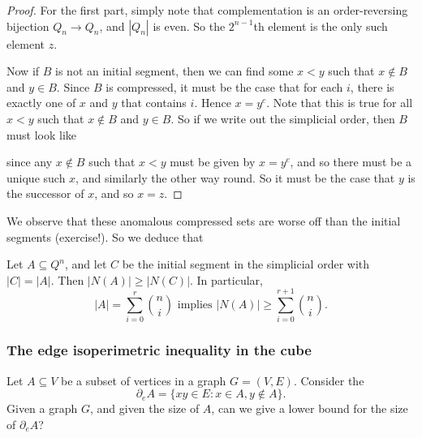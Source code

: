 \documentclass[a4paper]{article}
\begin{document}
\begin{proof}
  For the first part, simply note that complementation is an order-reversing bijection $Q_n \to Q_n$, and $|Q_n|$ is even. So the $2^{n - 1}$th element is the only such element $z$.

  Now if $B$ is not an initial segment, then we can find some $x < y$ such that $x \not \in B$ and $y \in B$. Since $B$ is compressed, it must be the case that for each $i$, there is exactly one of $x$ and $y$ that contains $i$. Hence $x = y^c$. Note that this is true for all $x < y$ such that $x \not \in B$ and $y \in B$. So if we write out the simplicial order, then $B$ must look like
  \begin{center}
  \end{center}
 since any $x \not \in B$ such that $x < y$ must be given by $x = y^c$, and so there must be a unique such $x$, and similarly the other way round. So it must be the case that $y$ is the successor of $x$, and so $x = z$.
\end{proof}
We observe that these anomalous compressed sets are worse off than the initial segments (exercise!). So we deduce that


\begin{thm}[Harper, 1967]
  Let $A \subseteq Q^n$, and let $C$ be the initial segment in the simplicial order with $|C| = |A|$. Then $|N(A)| \geq |N(C)|$. In particular,
  \[
    |A| = \sum_{i = 0}^r \binom{n}{i}\text{ implies } |N(A)| \geq \sum_{i = 0}^{r + 1} \binom{n}{i}.
  \]
\end{thm}

\subsubsection*{The edge isoperimetric inequality in the cube}
Let $A \subseteq V$ be a subset of vertices in a graph $G = (V, E)$. Consider the 
\[
  \partial_e A = \{xy \in E: x \in A, y \not \in A\}.
\]
Given a graph $G$, and given the size of $A$, can we give a lower bound for the size of $\partial_e A$?
\end{document}

